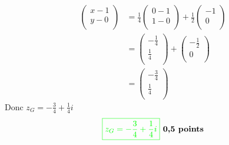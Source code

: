 \documentclass[12pt]{article}
\begin{document}
\begin{itemize}
\begin{align*}
\begin{pmatrix}x-1 \\y-0 \\ \end{pmatrix} &=\frac{1}{4}\begin{pmatrix}0-1 \\1-0 \\ \end{pmatrix}+\frac{1}{2}\begin{pmatrix}-1 \\0 \\ \end{pmatrix} \\
&=\begin{pmatrix}-\frac{1}{4} \\ \frac{1}{4} \\ \end{pmatrix}+\begin{pmatrix}-\frac{1}{2} \\0 \\ \end{pmatrix}\\
&=\begin{pmatrix}-\frac{3}{4} \\ \frac{1}{4} \\ \end{pmatrix}
\end{align*}
Donc \( z_{G}=-\frac{3}{4}+\frac{1}{4}i \)
\[
\textcolor{green}{\boxed{ z_{G}=-\frac{3}{4}+\frac{1}{4}i }} \textbf{ 0,5 points}
\]
\end{itemize}

\end{document}

